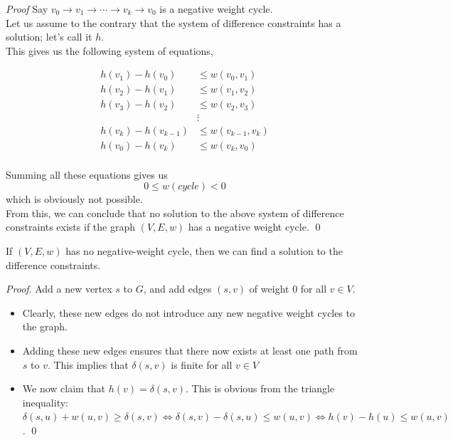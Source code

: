 \documentclass[aspectratio=169]{beamer}
\begin{document}
\begin{frame}{\textit{Proof}}
    \scriptsize
    Say $v_0 \rightarrow v_1 \rightarrow \cdots \rightarrow v_k \rightarrow v_0$ is a negative weight cycle.\\
    Let us assume to the contrary that the system of difference constraints has a solution; let's call it $h$.\\
    This gives us the following system of equations,

    \begin{equation*}
        \begin{align*}
            h(v_1) - h(v_0) & \leq w(v_0, v_1) \\
            h(v_2) - h(v_1) & \leq w(v_1, v_2) \\
            h(v_3) - h(v_2) & \leq w(v_2, v_3) \\
                            & \vdots \\
            h(v_k) - h(v_{k-1}) & \leq w(v_{k-1}, v_k) \\
            h(v_0) - h(v_k) & \leq w(v_k, v_0) \\
        \end{align*}
    \end{equation*}

    Summing all these equations gives us
    $$
        0 \leq w(cycle) < 0
    $$
    which is obviously not possible. \\
    From this, we can conclude that no solution to the above system of difference constraints exists if the graph $(V, E, w)$ has a negative weight cycle. \qed
\end{frame}

\begin{frame}{}
    \begin{tcolorbox}[title=Theorem.]
        If $(V, E, w)$ has no negative-weight cycle, then we can ﬁnd a solution to the difference constraints.
    \end{tcolorbox}
    \scriptsize
    \textit{Proof}. Add a new vertex $s$ to $G$, and add edges $(s, v)$ of weight $0$ for all $v \in V$.
    \begin{itemize}
        \item Clearly, these new edges do not introduce any new negative weight cycles to the graph.
        \item Adding these new edges ensures that there now exists at least one path from $s$ to $v$. This implies that $\delta(s, v)$ is finite for all $v \in V$
        \item We now claim that $h(v) = \delta(s, v)$. This is obvious from the triangle inequality: $\delta(s, u) + w(u, v) \geq \delta(s, v) \Leftrightarrow \delta(s, v) - \delta(s, u) \leq w(u, v) \Leftrightarrow h(v) - h(u) \leq w(u, v)$. \qed
    \end{itemize}
\end{frame}
\end{document}
